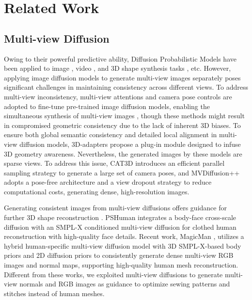 \section{Related Work}
\subsection{Multi-view Diffusion} 

Owing to their powerful predictive ability, Diffusion Probabilistic Models \cite{ho2020denoising} have been applied to image \cite{nichol2021glide, zhang2023adding, dhariwal2021diffusion, ruiz2023dreambooth, saharia2022palette}, video \cite{chen2024videocrafter2, ho2022video}, and 3D shape synthesis tasks \cite{long2023wonder3d, yu2023surf, tang2023dreamgaussian}, etc. However, applying image diffusion models to generate multi-view images separately poses significant challenges in maintaining consistency across different views. To address multi-view inconsistency, multi-view attentions and camera pose controls are adopted to fine-tune pre-trained image diffusion models, enabling the simultaneous synthesis of multi-view images \cite{shi2023mvdream, wang2023imagedream, xu2023dmv3d, yang2024consistnet, shi2023zero123++, long2024wonder3d}, though these methods might result in compromised geometric consistency due to the lack of inherent 3D biases. To ensure both global semantic consistency and detailed local alignment in multi-view diffusion models, 3D-adapters \cite{chen20243d} propose a plug-in module designed to infuse 3D geometry awareness. Nevertheless, the generated images by these models are sparse views. To address this issue, CAT3D \cite{gao2024cat3d} introduces an efficient parallel sampling strategy to generate a large set of camera poses, and MVDiffusion++ \cite{tang2025mvdiffusion++} adopts a pose-free architecture and a view dropout strategy to reduce computational costs, generating dense, high-resolution images. 

Generating consistent images from multi-view diffusions offers guidance for further 3D shape reconstruction \cite{gao2024cat3d}. PSHuman \cite{li2024pshuman} integrates a body-face cross-scale diffusion with an SMPL-X conditioned multi-view diffusion for clothed human reconstruction with high-quality face details. Recent work, MagicMan \cite{he2024magicman}, utilizes a hybrid human-specific multi-view diffusion model with 3D SMPL-X-based body priors and 2D diffusion priors to consistently generate dense multi-view RGB images and normal maps, supporting high-quality human mesh reconstruction. Different from these works, we exploited multi-view diffusions to generate multi-view normals and RGB images as guidance to optimize sewing patterns and stitches instead of human meshes.



